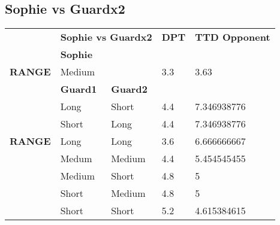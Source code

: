 \subsection{Sophie vs Guardx2}
\begin{table}[H]
  \centering
\begin{tabular}{ll|l|l|l|}
\cline{2-5}
\multicolumn{1}{l|}{} & \multicolumn{2}{c|}{\cellcolor[HTML]{C0C0C0}\textbf{Sophie vs Guardx2}} & \cellcolor[HTML]{C0C0C0}\textbf{DPT} & \cellcolor[HTML]{C0C0C0}\textbf{TTD Opponent} \\ \cline{2-5} 
\multicolumn{1}{l|}{\textbf{}} & \multicolumn{2}{l|}{\textbf{Sophie}} & \multicolumn{2}{l|}{} \\ \hline
\multicolumn{1}{|l|}{\cellcolor[HTML]{C0C0C0}\textbf{RANGE}} & \multicolumn{2}{l|}{Medium} & 3.3 & 3.63 \\ \hline
\multicolumn{1}{l|}{} & \textbf{Guard1} & \textbf{Guard2} & \multicolumn{2}{l|}{} \\ \hline
\multicolumn{1}{|l|}{\cellcolor[HTML]{C0C0C0}} & Long & Short & 4.4 & 7.346938776 \\ \cline{2-5} 
\multicolumn{1}{|l|}{\cellcolor[HTML]{C0C0C0}} & Short & Long & 4.4 & 7.346938776 \\ \cline{2-5} 
\multicolumn{1}{|l|}{\cellcolor[HTML]{C0C0C0} \textbf{RANGE}} & Long & Long & 3.6 & 6.666666667 \\ \cline{2-5} 
\multicolumn{1}{|l|}{\cellcolor[HTML]{C0C0C0}} & Medum & Medium & 4.4 & 5.454545455 \\ \cline{2-5} 
\multicolumn{1}{|l|}{\cellcolor[HTML]{C0C0C0}} & Medium & Short & 4.8 & 5 \\ \cline{2-5} 
\multicolumn{1}{|l|}{\cellcolor[HTML]{C0C0C0}} & Short & Medium & 4.8 & 5 \\ \cline{2-5} 
\multicolumn{1}{|l|}{\cellcolor[HTML]{C0C0C0}} & Short & Short & 5.2 & 4.615384615 \\ \hline 
\end{tabular}
\end{table}

